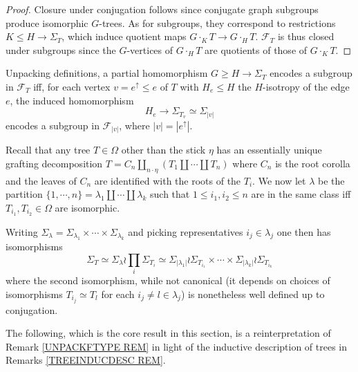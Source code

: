 \documentclass[a4paper,10pt]{article}%
\begin{document}
\begin{proof}
	Closure under conjugation follows since conjugate graph subgroups produce isomorphic $G$-trees.
	As for subgroups, they correspond to restrictions $K \leq H \to \Sigma_T$,
	which induce quotient maps 
	$G \cdot_K T \to G \cdot_H T$. 
	$\mathcal{F}_T$ is thus closed under subgroups since the $G$-vertices of $ G \cdot_H T$ are quotients of those of $G \cdot_K T$.
\end{proof}


\begin{remark}\label{UNPACKFTYPE REM}
Unpacking definitions, a partial homomorphism 
$G \geq H \to \Sigma_T$
encodes a subgroup in $\mathcal{F}_T$
iff, for each vertex $v= e^{\uparrow} \leq e$ of $T$ with 
$H_e \leq H$ the
$H$-isotropy of the edge $e$, the induced homomorphism
\begin{equation}\label{PARTIALHOMEDGE EQ}
H_e \to \Sigma_{T_{v}} \simeq 
\Sigma_{|v|}
\end{equation}
encodes a subgroup in $\mathcal{F}_{|v|}$, where $|v|=|e^{\uparrow}|$.
\end{remark}


\begin{remark}\label{TREEINDUCDESC REM}
Recall that any tree $T \in \Omega$ other than the stick $\eta$ has an essentially unique grafting decomposition
$T= C_n \amalg_{n \cdot \eta}(T_1 \amalg \cdots \amalg T_n)$ where $C_n$ is the root corolla and the leaves of $C_n$ are identified with the roots of the $T_i$. We now let 
$\lambda$ be the partition 
$\{1,\cdots,n\} = \lambda_1 \amalg\cdots \amalg \lambda_k$
 such that $1 \leq i_1, i_2 \leq n$ are in the same class iff
 $T_{i_1}, T_{i_2} \in \Omega$ are isomorphic.
 
 Writing 
 $\Sigma_{\lambda} = \Sigma_{\lambda_1} \times \cdots \times
 \Sigma_{\lambda_k}$
and picking representatives $i_j \in \lambda_j$ 
one then has isomorphisms
\begin{equation}\label{TREEISOT EQ}
	\Sigma_T \simeq \Sigma_{\lambda} \wr \prod_{i} \Sigma_{T_i}
		\simeq
	\Sigma_{|\lambda_1|} \wr \Sigma_{T_{i_1}}
		\times \cdots \times	
	\Sigma_{|\lambda_k|} \wr \Sigma_{T_{i_k}}
\end{equation}
where the second isomorphism, while not canonical 
(it depends on choices of isomorphisms $T_{i_j} \simeq T_l$ for each $i_j \neq l \in \lambda_j$) is nonetheless well defined up to conjugation.
\end{remark}


The following, which is the core result in this section, is a reinterpretation of 
Remark \ref{UNPACKFTYPE REM}
in light of the inductive description of trees in
Remarks \ref{TREEINDUCDESC REM}.
\end{document}
